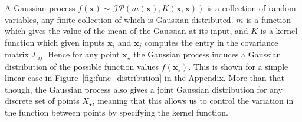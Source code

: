 \documentclass[10pt]{article}
\begin{document}
A Gaussian process $f(\mathbf{x}) \sim \mathcal{GP}(m(\mathbf{x}), K(\mathbf{x}, \mathbf{x}))$ is a collection
of random variables, any finite collection of which is Gaussian distributed. 
$m$ is a function which gives the value of the mean of the Gaussian at its input, and $K$ is a kernel function which given
inputs $\mathbf{x}_i$ and $\mathbf{x}_j$ computes the entry in the covariance matrix $\Sigma_{ij}$. Hence for any point
$\mathbf{x}_{\star}$ the Gaussian process induces a Gaussian distribution of the possible function values $f(\mathbf{x}_{\star})$.
This is shown for a simple linear case in Figure~\ref{fig:func_distribution} in the Appendix. More than that though, the Gaussian process also gives
a joint Gaussian distribution for any discrete set of points $X_{\star}$, meaning that this allows us to control the variation in the
function between points by specifying the kernel function. 
\end{document}
